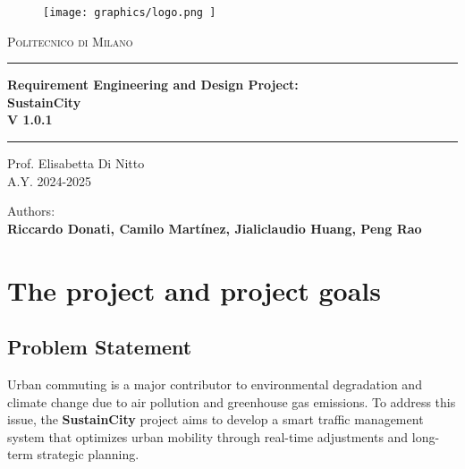 \documentclass[11.5pt]{article}
\begin{document}
    \begin{titlingpage}
        \begin{center}
            \begin{figure}
                \centering
                \texttt{[image: 
                    graphics/logo.png
                ]}
            \end{figure}
            \Large{\textsc{Politecnico di Milano}}
            \vspace{1cm}
            \rule{0.95\textwidth}{0.7mm}
            {\Large{\textbf{Requirement Engineering and Design Project:\\ SustainCity \\ V 1.0.1}}}
            \rule{0.95\textwidth}{0.7mm}
            \vspace{1cm}
            \large{Prof. Elisabetta Di Nitto \\ A.Y. 2024-2025}
            \vspace{1cm}

            \large{Authors: \\ \textbf{Riccardo Donati, Camilo Martínez, Jialiclaudio Huang, Peng Rao}}

            \vspace{1cm}
            
        \end{center}
    \end{titlingpage}


    \tableofcontents

    \clearpage

    \setcounter{page}{1}

    \section{The project and project goals}
    \subsection{Problem Statement}
    Urban commuting is a major contributor to environmental degradation and climate change due to air pollution and greenhouse gas emissions. To address this issue, the \textbf{SustainCity} project aims to develop a smart traffic management system that optimizes urban mobility through real-time adjustments and long-term strategic planning.
\end{document}
